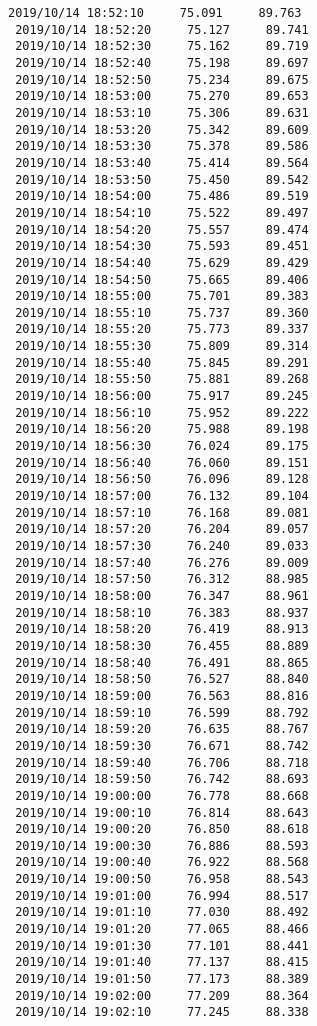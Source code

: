\documentclass[11pt]{article}
\begin{document}
\begin{Verbatim}[commandchars=\\\{\}]
 2019/10/14 18:52:10     75.091     89.763
 2019/10/14 18:52:20     75.127     89.741
 2019/10/14 18:52:30     75.162     89.719
 2019/10/14 18:52:40     75.198     89.697
 2019/10/14 18:52:50     75.234     89.675
 2019/10/14 18:53:00     75.270     89.653
 2019/10/14 18:53:10     75.306     89.631
 2019/10/14 18:53:20     75.342     89.609
 2019/10/14 18:53:30     75.378     89.586
 2019/10/14 18:53:40     75.414     89.564
 2019/10/14 18:53:50     75.450     89.542
 2019/10/14 18:54:00     75.486     89.519
 2019/10/14 18:54:10     75.522     89.497
 2019/10/14 18:54:20     75.557     89.474
 2019/10/14 18:54:30     75.593     89.451
 2019/10/14 18:54:40     75.629     89.429
 2019/10/14 18:54:50     75.665     89.406
 2019/10/14 18:55:00     75.701     89.383
 2019/10/14 18:55:10     75.737     89.360
 2019/10/14 18:55:20     75.773     89.337
 2019/10/14 18:55:30     75.809     89.314
 2019/10/14 18:55:40     75.845     89.291
 2019/10/14 18:55:50     75.881     89.268
 2019/10/14 18:56:00     75.917     89.245
 2019/10/14 18:56:10     75.952     89.222
 2019/10/14 18:56:20     75.988     89.198
 2019/10/14 18:56:30     76.024     89.175
 2019/10/14 18:56:40     76.060     89.151
 2019/10/14 18:56:50     76.096     89.128
 2019/10/14 18:57:00     76.132     89.104
 2019/10/14 18:57:10     76.168     89.081
 2019/10/14 18:57:20     76.204     89.057
 2019/10/14 18:57:30     76.240     89.033
 2019/10/14 18:57:40     76.276     89.009
 2019/10/14 18:57:50     76.312     88.985
 2019/10/14 18:58:00     76.347     88.961
 2019/10/14 18:58:10     76.383     88.937
 2019/10/14 18:58:20     76.419     88.913
 2019/10/14 18:58:30     76.455     88.889
 2019/10/14 18:58:40     76.491     88.865
 2019/10/14 18:58:50     76.527     88.840
 2019/10/14 18:59:00     76.563     88.816
 2019/10/14 18:59:10     76.599     88.792
 2019/10/14 18:59:20     76.635     88.767
 2019/10/14 18:59:30     76.671     88.742
 2019/10/14 18:59:40     76.706     88.718
 2019/10/14 18:59:50     76.742     88.693
 2019/10/14 19:00:00     76.778     88.668
 2019/10/14 19:00:10     76.814     88.643
 2019/10/14 19:00:20     76.850     88.618
 2019/10/14 19:00:30     76.886     88.593
 2019/10/14 19:00:40     76.922     88.568
 2019/10/14 19:00:50     76.958     88.543
 2019/10/14 19:01:00     76.994     88.517
 2019/10/14 19:01:10     77.030     88.492
 2019/10/14 19:01:20     77.065     88.466
 2019/10/14 19:01:30     77.101     88.441
 2019/10/14 19:01:40     77.137     88.415
 2019/10/14 19:01:50     77.173     88.389
 2019/10/14 19:02:00     77.209     88.364
 2019/10/14 19:02:10     77.245     88.338

\end{Verbatim}
\end{document}
